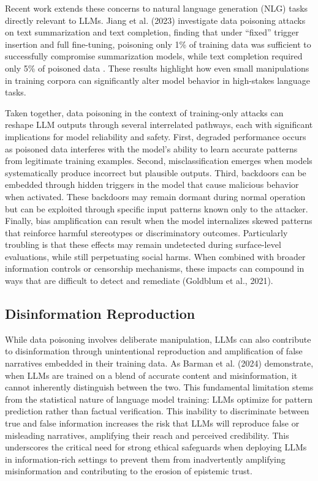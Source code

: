 \documentclass[conference=acm]{confpaper}
\begin{document}
Recent work extends these concerns to natural language generation (NLG) tasks directly relevant to LLMs. Jiang et al. (2023) investigate data poisoning attacks on text summarization and text completion, finding that under “fixed” trigger insertion and full fine-tuning, poisoning only 1\% of training data was sufficient to successfully compromise summarization models, while text completion required only 5\% of poisoned data \cite{Jiang}. These results highlight how even small manipulations in training corpora can significantly alter model behavior in high-stakes language tasks.

Taken together, data poisoning in the context of training-only attacks can reshape LLM outputs through several interrelated pathways, each with significant implications for model reliability and safety. First, degraded performance occurs as poisoned data interferes with the model's ability to learn accurate patterns from legitimate training examples. Second, misclassification emerges when models systematically produce incorrect but plausible outputs. Third, backdoors can be embedded through hidden triggers in the model that cause malicious behavior when activated. These backdoors may remain dormant during normal operation but can be exploited through specific input patterns known only to the attacker. Finally, bias amplification can result when the model internalizes skewed patterns that reinforce harmful stereotypes or discriminatory outcomes. Particularly troubling is that these effects may remain undetected during surface-level evaluations, while still perpetuating social harms. When combined with broader information controls or censorship mechanisms, these impacts can compound in ways that are difficult to detect and remediate (Goldblum et al., 2021).

\subsection{Disinformation Reproduction}

While data poisoning involves deliberate manipulation, LLMs can also contribute to disinformation through unintentional reproduction and amplification of false narratives embedded in their training data. As Barman et al. (2024) demonstrate, when LLMs are trained on a blend of accurate content and misinformation, it cannot inherently distinguish between the two. This fundamental limitation stems from the statistical nature of language model training: LLMs optimize for pattern prediction rather than factual verification. \cite{Barman} This inability to discriminate between true and false information increases the risk that LLMs will reproduce false or misleading narratives, amplifying their reach and perceived credibility. This underscores the critical need for strong ethical safeguards when deploying LLMs in information-rich settings to prevent them from inadvertently amplifying misinformation and contributing to the erosion of epistemic trust.
\end{document}
